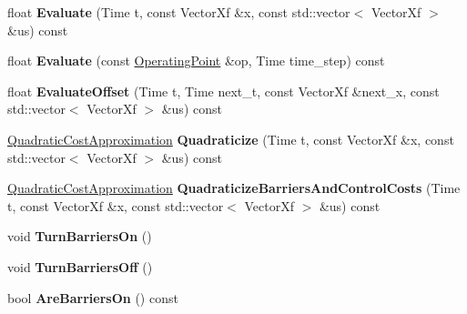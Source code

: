 \begin{DoxyCompactItemize}
\item 
float {\bfseries Evaluate} (Time t, const Vector\+Xf \&x, const std\+::vector$<$ Vector\+Xf $>$ \&us) const \hypertarget{classilqgames_1_1_player_cost_ac1ad99a1822d97a53d084fd9da162cb1}{}\label{classilqgames_1_1_player_cost_ac1ad99a1822d97a53d084fd9da162cb1}

\item 
float {\bfseries Evaluate} (const \hyperlink{structilqgames_1_1_operating_point}{Operating\+Point} \&op, Time time\+\_\+step) const \hypertarget{classilqgames_1_1_player_cost_a8c7fc17986dfb478df17cf9f8da85926}{}\label{classilqgames_1_1_player_cost_a8c7fc17986dfb478df17cf9f8da85926}

\item 
float {\bfseries Evaluate\+Offset} (Time t, Time next\+\_\+t, const Vector\+Xf \&next\+\_\+x, const std\+::vector$<$ Vector\+Xf $>$ \&us) const \hypertarget{classilqgames_1_1_player_cost_a56bf9c10b7ffa6fbdfb1a9bff1ce65c3}{}\label{classilqgames_1_1_player_cost_a56bf9c10b7ffa6fbdfb1a9bff1ce65c3}

\item 
\hyperlink{structilqgames_1_1_quadratic_cost_approximation}{Quadratic\+Cost\+Approximation} {\bfseries Quadraticize} (Time t, const Vector\+Xf \&x, const std\+::vector$<$ Vector\+Xf $>$ \&us) const \hypertarget{classilqgames_1_1_player_cost_ad3962847f8eda8bcfecf2096e6abccb6}{}\label{classilqgames_1_1_player_cost_ad3962847f8eda8bcfecf2096e6abccb6}

\item 
\hyperlink{structilqgames_1_1_quadratic_cost_approximation}{Quadratic\+Cost\+Approximation} {\bfseries Quadraticize\+Barriers\+And\+Control\+Costs} (Time t, const Vector\+Xf \&x, const std\+::vector$<$ Vector\+Xf $>$ \&us) const \hypertarget{classilqgames_1_1_player_cost_a5986cbef9121912f74735dcad338e50a}{}\label{classilqgames_1_1_player_cost_a5986cbef9121912f74735dcad338e50a}

\item 
void {\bfseries Turn\+Barriers\+On} ()\hypertarget{classilqgames_1_1_player_cost_a41f2c3cac0d44adaaf0654006ab4bbd3}{}\label{classilqgames_1_1_player_cost_a41f2c3cac0d44adaaf0654006ab4bbd3}

\item 
void {\bfseries Turn\+Barriers\+Off} ()\hypertarget{classilqgames_1_1_player_cost_aff8945f0b63b3ebfe61636d43f0e0bed}{}\label{classilqgames_1_1_player_cost_aff8945f0b63b3ebfe61636d43f0e0bed}

\item 
bool {\bfseries Are\+Barriers\+On} () const \hypertarget{classilqgames_1_1_player_cost_a3c9c1044f87e32188418adacc6efd40f}{}\label{classilqgames_1_1_player_cost_a3c9c1044f87e32188418adacc6efd40f}


\end{DoxyCompactItemize}
